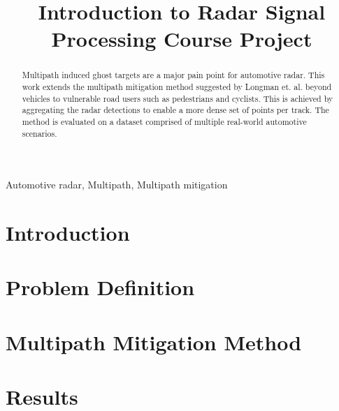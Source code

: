 \documentclass[conference]{IEEEtran}
\begin{document}
\title{Introduction to Radar Signal Processing Course Project}

\author{ 
}

\maketitle

\begin{abstract}
Multipath induced ghost targets are a major pain point for automotive radar. This work extends the multipath mitigation method suggested by Longman et. al. \cite{longman_multipath_2021} beyond vehicles to vulnerable road users such as pedestrians and cyclists. This is achieved by aggregating the radar detections to enable a more dense set of points per track. The method is evaluated on a dataset comprised of multiple real-world automotive scenarios.
\end{abstract}

\begin{IEEEkeywords}
Automotive radar, Multipath, Multipath mitigation
\end{IEEEkeywords}

\section{Introduction}

 

\section{Problem Definition}


\section{Multipath Mitigation Method}


\section{Results}

\end{document}
